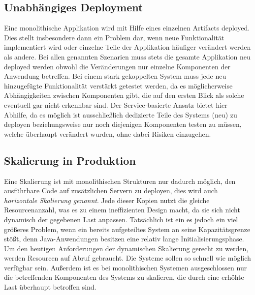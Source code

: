 \subsection{Unabhängiges Deployment \checkmark}
Eine monolithische Applikation wird mit Hilfe eines einzelnen Artifacts deployed. Dies stellt insbesondere dann ein Problem dar, wenn neue Funktionalität implementiert wird oder einzelne Teile der Applikation häufiger verändert werden als andere. Bei allen genannten Szenarien muss stets die gesamte Applikation neu deployed werden obwohl die Veränderungen nur einzelne Komponenten der Anwendung betreffen. Bei einem stark gekoppelten System muss jede neu hinzugefügte Funktionalität verstärkt getestet werden, da es möglicherweise Abhängigkeiten zwischen Komponenten gibt, die auf den ersten Blick als solche eventuell gar nicht erkennbar sind. Der Service-basierte Ansatz bietet hier Abhilfe, da es möglich ist ausschließlich dedizierte Teile des Systems (neu) zu deployen beziehungsweise nur noch diejenigen Komponenten testen zu müssen, welche überhaupt verändert wurden, ohne dabei Risiken einzugehen. 


\subsection{Skalierung in Produktion \checkmark}
Eine Skalierung ist mit monolithischen Strukturen nur dadurch möglich, den ausführbare Code auf zusätzlichen Servern zu deployen, dies wird auch \emph{horizontale Skalierung genannt}. Jede dieser Kopien nutzt die gleiche Resourcenanzahl, was es zu einem ineffizienten Design macht, da sie sich nicht dynamisch der gegebenen Last anpassen. Tatsächlich ist ein es jedoch ein viel größeres Problem, wenn ein bereits aufgeteiltes System an seine Kapazitätsgrenze stößt, denn Java-Anwendungen besitzen eine relativ lange Initialisierungsphase. Um den heutigen Anforderungen der dynamischen Skalierung gerecht zu werden, werden Resourcen auf Abruf gebraucht. Die Systeme sollen so schnell wie möglich verfügbar sein. Außerdem ist es bei monolithischen Systemen ausgeschlossen nur die betreffenden Komponenten des Systems zu skalieren, die durch eine erhöhte Last überhaupt betroffen sind.



